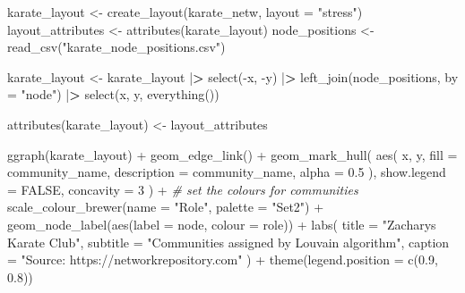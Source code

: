 \documentclass[
]{article}
\newenvironment{Shaded}{\begin{snugshade}}{\end{snugshade}}
\newcommand{\AttributeTok}[1]{\textcolor[rgb]{0.77,0.63,0.00}{#1}}
\newcommand{\CommentTok}[1]{\textcolor[rgb]{0.56,0.35,0.01}{\textit{#1}}}
\newcommand{\ConstantTok}[1]{\textcolor[rgb]{0.00,0.00,0.00}{#1}}
\newcommand{\DecValTok}[1]{\textcolor[rgb]{0.00,0.00,0.81}{#1}}
\newcommand{\ErrorTok}[1]{\textcolor[rgb]{0.64,0.00,0.00}{\textbf{#1}}}
\newcommand{\FloatTok}[1]{\textcolor[rgb]{0.00,0.00,0.81}{#1}}
\newcommand{\FunctionTok}[1]{\textcolor[rgb]{0.00,0.00,0.00}{#1}}
\newcommand{\NormalTok}[1]{#1}
\newcommand{\OtherTok}[1]{\textcolor[rgb]{0.56,0.35,0.01}{#1}}
\newcommand{\SpecialCharTok}[1]{\textcolor[rgb]{0.00,0.00,0.00}{#1}}
\newcommand{\StringTok}[1]{\textcolor[rgb]{0.31,0.60,0.02}{#1}}
\begin{document}
\begin{Shaded}
\begin{Highlighting}[]
\NormalTok{karate\_layout }\OtherTok{\textless{}{-}} \FunctionTok{create\_layout}\NormalTok{(karate\_netw, }\AttributeTok{layout =} \StringTok{"stress"}\NormalTok{)}
\NormalTok{layout\_attributes }\OtherTok{\textless{}{-}} \FunctionTok{attributes}\NormalTok{(karate\_layout)}
\NormalTok{node\_positions }\OtherTok{\textless{}{-}} \FunctionTok{read\_csv}\NormalTok{(}\StringTok{"karate\_node\_positions.csv"}\NormalTok{)}

\NormalTok{karate\_layout }\OtherTok{\textless{}{-}}
\NormalTok{  karate\_layout }\SpecialCharTok{|}\ErrorTok{\textgreater{}}
  \FunctionTok{select}\NormalTok{(}\SpecialCharTok{{-}}\NormalTok{x, }\SpecialCharTok{{-}}\NormalTok{y) }\SpecialCharTok{|}\ErrorTok{\textgreater{}}
  \FunctionTok{left\_join}\NormalTok{(node\_positions, }\AttributeTok{by =} \StringTok{"node"}\NormalTok{) }\SpecialCharTok{|}\ErrorTok{\textgreater{}}
  \FunctionTok{select}\NormalTok{(x, y, }\FunctionTok{everything}\NormalTok{())}

\FunctionTok{attributes}\NormalTok{(karate\_layout) }\OtherTok{\textless{}{-}}\NormalTok{ layout\_attributes}

\FunctionTok{ggraph}\NormalTok{(karate\_layout) }\SpecialCharTok{+}
  \FunctionTok{geom\_edge\_link}\NormalTok{() }\SpecialCharTok{+}
  \FunctionTok{geom\_mark\_hull}\NormalTok{(}
    \FunctionTok{aes}\NormalTok{(}
\NormalTok{      x, y,}
      \AttributeTok{fill =}\NormalTok{ community\_name,}
      \AttributeTok{description =}\NormalTok{ community\_name,}
      \AttributeTok{alpha =} \FloatTok{0.5}
\NormalTok{    ),}
    \AttributeTok{show.legend =} \ConstantTok{FALSE}\NormalTok{,}
    \AttributeTok{concavity =} \DecValTok{3}
\NormalTok{  ) }\SpecialCharTok{+}
  \CommentTok{\# set the colours for communities}
  \FunctionTok{scale\_colour\_brewer}\NormalTok{(}\AttributeTok{name =} \StringTok{"Role"}\NormalTok{, }\AttributeTok{palette =} \StringTok{"Set2"}\NormalTok{) }\SpecialCharTok{+}
  \FunctionTok{geom\_node\_label}\NormalTok{(}\FunctionTok{aes}\NormalTok{(}\AttributeTok{label =}\NormalTok{ node, }\AttributeTok{colour =}\NormalTok{ role)) }\SpecialCharTok{+}
  \FunctionTok{labs}\NormalTok{(}
    \AttributeTok{title =} \StringTok{"Zachary\textquotesingle{}s Karate Club"}\NormalTok{,}
    \AttributeTok{subtitle =} \StringTok{"Communities assigned by Louvain algorithm"}\NormalTok{,}
    \AttributeTok{caption =} \StringTok{"Source: https://networkrepository.com"}
\NormalTok{  ) }\SpecialCharTok{+}
  \FunctionTok{theme}\NormalTok{(}\AttributeTok{legend.position =} \FunctionTok{c}\NormalTok{(}\FloatTok{0.9}\NormalTok{, }\FloatTok{0.8}\NormalTok{))}
\end{Highlighting}
\end{Shaded}
\end{document}
